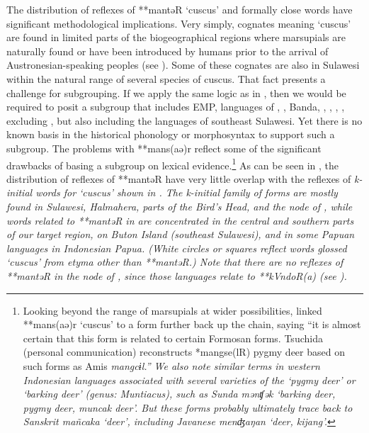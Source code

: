 The distribution of reflexes of **mantəR ‘cuscus’
and formally close words have significant methodological implications.
Very simply, cognates meaning ‘cuscus’ are found in limited parts
of the biogeographical regions where marsupials are naturally
found or have been introduced by humans prior to the arrival
of Austronesian-speaking peoples (see ).
Some of these cognates are also in Sulawesi within the natural
range of several species of cuscus.
That fact presents a challenge for subgrouping.
If we apply the same logic as in \citet{Blust1982,
Blust1993,Blust2009,Blust2012b}, then we would be required to posit a subgroup
that includes EMP, languages of , ,
Banda, , , ,
, excluding ,
but also including the  languages of southeast Sulawesi.
Yet there is no known basis in the historical phonology or morphosyntax
to support such a subgroup.
The problems with **mans(aə)r reflect some of the significant
drawbacks of basing a subgroup on lexical evidence.\footnote{
		Looking beyond the range of marsupials at wider possibilities,
		\citet[143, endnote 72]{Collins1983} linked **mans(aə)r ‘cuscus’ to
		a form further back up the chain,
		saying “it is almost certain that this form is related to certain Formosan forms.
		Tsuchida (personal communication) reconstructs *mangse(lR) pygmy
		deer based on such forms as Amis \it{mangcɨl}.” We also note
		similar terms in western Indonesian languages associated with
		several varieties of the ‘pygmy deer’ or ‘barking deer’ (genus:
		\it{Muntiacus}), such as Sunda \it{mənʧək} ‘barking deer,
		pygmy deer, muncak deer’.
		But these forms probably ultimately trace back to Sanskrit \it{mañcaka}
		‘deer’, including Javanese \it{menʤaŋan} ‘deer,
		kijang’.} 
As can be seen in ,
the distribution of reflexes of **mantəR have very little overlap
with the reflexes of \it{k}-initial words for ‘cuscus’ shown in .
The \it{k}-initial family of forms are mostly found in Sulawesi,
Halmahera, parts of the Bird's Head,
and the  node of ,
while words related to **mantəR in  are concentrated
in the central and southern parts of our target region,
on Buton Island (southeast Sulawesi),
and in some Papuan languages in Indonesian Papua.
(White circles or squares reflect words glossed ‘cuscus’ from
etyma other than **mantəR.) Note that there are no reflexes of
**mantəR in the  node of ,
since those languages relate to **kVndoR(a) (see ).

